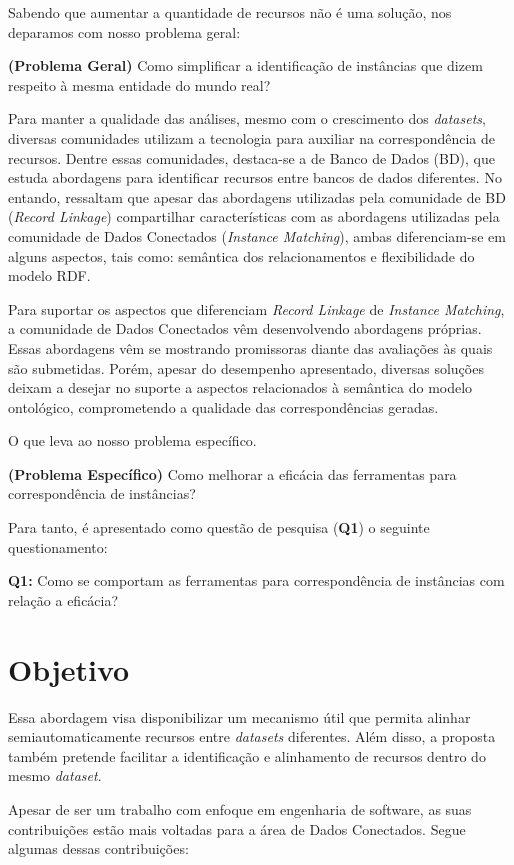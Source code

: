 Sabendo que aumentar a quantidade de recursos não é uma solução, nos deparamos com nosso problema geral:

\textbf{(Problema Geral)} Como simplificar a identificação de instâncias que dizem respeito à mesma entidade do mundo real?

Para manter a qualidade das análises, mesmo com o crescimento dos \textit{datasets}, diversas comunidades utilizam a tecnologia para auxiliar na correspondência de recursos. Dentre essas comunidades, destaca-se a de Banco de Dados (BD), que estuda abordagens para identificar recursos entre bancos de dados diferentes. No entando,  ressaltam que apesar das abordagens utilizadas pela comunidade de BD (\textit{Record Linkage}) compartilhar características com as abordagens utilizadas pela comunidade de Dados Conectados (\textit{Instance Matching}), ambas diferenciam-se em alguns aspectos, tais como: semântica dos relacionamentos e flexibilidade do modelo RDF.

Para suportar os aspectos que diferenciam \textit{Record Linkage} de \textit{Instance Matching}, a comunidade de Dados Conectados vêm desenvolvendo abordagens próprias. Essas abordagens vêm se mostrando promissoras diante das avaliações às quais são submetidas. Porém, apesar do desempenho apresentado, diversas soluções deixam a desejar no suporte a aspectos relacionados à semântica do modelo ontológico, comprometendo a qualidade das correspondências geradas.

O que leva ao nosso problema específico.

\textbf{(Problema Específico)} Como melhorar a eficácia das ferramentas para correspondência de instâncias?

Para tanto, é apresentado como questão de pesquisa (\textbf{Q1}) o seguinte questionamento:

\textbf{Q1:} Como se comportam as ferramentas para correspondência de instâncias com relação a eficácia?

\section{Objetivo}


Essa abordagem visa disponibilizar um mecanismo útil que permita alinhar semiautomaticamente recursos entre \textit{datasets} diferentes. Além disso, a proposta também pretende facilitar a identificação e alinhamento de recursos dentro do mesmo \textit{dataset}. 

Apesar de ser um trabalho com enfoque em engenharia de software, as suas contribuições estão mais voltadas para a área de Dados Conectados. Segue algumas dessas contribuições:

